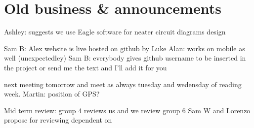 \documentclass[a4paper,11pt,twoside,class=meetingmins,crop=false]{standalone}
\begin{document}

\maketitle
{}
\section{Old business \& announcements}
\begin{items}
    \item \priormins
\end{items}





Ashley: suggests we use Eagle software for neater circuit diagrams design


Sam B: Alex website is live hosted on github by Luke
Alan: works on mobile as well (unexpectedley)
Sam B: everybody gives github username to be inserted in the project or send me the text and I'll add it for you

next meeting tomorrow and meet as always tuesday and wedensday of reading week.
Martin: position of GPS?

Mid term review: group 4 reviews us and we review group 6
Sam W and Lorenzo propose for reviewing dependent on
\end{document}
